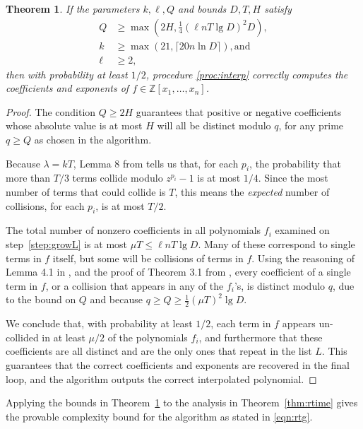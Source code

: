 \documentclass[letterpaper,10pt]{article}
\def\cite{\citep}
\newtheorem{theorem}{Theorem}
\newcommand{\ZZ}{\ensuremath{\mathbb{Z}}}
\begin{document}
\begin{theorem}\label{thm:bounds}
  If the parameters $k,\ell,Q$ and bounds $D,T,H$ satisfy 
  \begin{align*}
    Q &\ge \max\left(2H, \tfrac{1}{4}(\ell n T \lg D)^2 D\right),  \\
    k &\ge \max(21,\lceil20 n \ln D\rceil), \text{and} \\
    \ell &\ge 2,
  \end{align*}
  then with
  probability at least $1/2$, procedure \ref{proc:interp} correctly
  computes the coefficients and exponents of $f\in\ZZ[x_1,\ldots,x_n]$.
\end{theorem}
\begin{proof}
  The condition $Q \ge 2H$ guarantees that positive or negative
  coefficients whose absolute value is at most $H$ will all be distinct
  modulo $q$, for any prime $q\ge Q$ as chosen in the algorithm.

  Because $\lambda = kT$, Lemma 8 from \cite{AGR13}
  tells us that, for each $p_i$, the probability that more than $T/3$
  terms collide modulo $z^{p_i}-1$ is at most $1/4$.
  Since the most number of terms that could collide is $T$, this means
  the \emph{expected} number of collisions, for each $p_i$, is at
  most $T/2$.

  The total number of nonzero coefficients in all polynomials $f_i$ examined on
  step~\ref{step:growL} is at most $\mu T \le \ell n T \lg D$. Many of
  these correspond to single terms in $f$ itself, but some will be
  collisions of terms in $f$. Using the reasoning of Lemma 4.1 in
  \cite{AGR14}, and the proof of Theorem 3.1 from \cite{GR11a},
  every coefficient of a single term in $f$, or a collision that appears
  in any of the $f_i$'s, is distinct modulo $q$, due to the bound on
  $Q$ and because $q \ge Q \ge \tfrac{1}{2}(\mu T)^2 \lg D$.

  We conclude that, with probability at least $1/2$, each term in $f$
  appears un-collided in at least $\mu/2$ of the polynomials $f_i$, and
  furthermore that these coefficients are all distinct and are the only
  ones that repeat in the list $L$. This guarantees that the correct
  coefficients and exponents are recovered in the final loop, and the
  algorithm outputs the correct interpolated polynomial.
\end{proof}

Applying the bounds in Theorem~\ref{thm:bounds} to the analysis in
Theorem~\ref{thm:rtime} gives the provable complexity bound for the
algorithm as stated in \eqref{eqn:rtg}.
\end{document}
